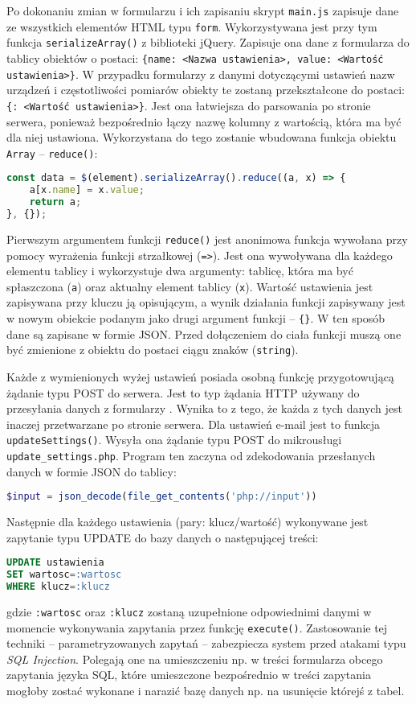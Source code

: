 \documentclass[a4paper,11pt,twoside]{article}
\begin{document}
Po dokonaniu zmian w formularzu i ich zapisaniu skrypt \texttt{main.js} zapisuje dane ze wszystkich elementów HTML typu \texttt{form}. Wykorzystywana jest przy tym funkcja \linebreak \texttt{serializeArray()} z biblioteki jQuery. Zapisuje ona dane z formularza do tablicy obiektów o postaci: \texttt{\{name: <Nazwa ustawienia>, value: <Wartość ustawienia>\}}. W przypadku formularzy z danymi dotyczącymi ustawień nazw urządzeń i częstotliwości pomiarów obiekty te zostaną przekształcone do postaci: \texttt{\{<Nazwa ustawienia>: <Wartość ustawienia>\}}. Jest ona łatwiejsza do parsowania po stronie serwera, ponieważ bezpośrednio łączy nazwę kolumny z wartością, która ma być dla niej ustawiona. Wykorzystana do tego zostanie wbudowana funkcja obiektu \texttt{Array} -- \texttt{reduce()}:
\begin{lstlisting}[language=JavaScript]
const data = $(element).serializeArray().reduce((a, x) => {
	a[x.name] = x.value;
	return a;
}, {});
\end{lstlisting}
Pierwszym argumentem funkcji \texttt{reduce()} jest anonimowa funkcja wywołana przy pomocy wyrażenia funkcji strzałkowej (\texttt{=>}). Jest ona wywoływana dla każdego elementu tablicy i wykorzystuje dwa argumenty: tablicę, która ma być spłaszczona (\texttt{a}) oraz aktualny element tablicy (\texttt{x}). Wartość ustawienia jest zapisywana przy kluczu ją opisującym, a wynik działania funkcji zapisywany jest w nowym obiekcie podanym jako drugi argument funkcji -- \texttt{\{\}}. W ten sposób dane są zapisane w formie JSON. Przed dołączeniem do ciała funkcji muszą one być zmienione z obiektu do postaci ciągu znaków (\texttt{string}).

Każde z wymienionych wyżej ustawień posiada osobną funkcję przygotowującą żądanie typu POST do serwera. Jest to typ żądania HTTP używany do przesyłania danych z formularzy \cite{http}. Wynika to z tego, że każda z tych danych jest inaczej przetwarzane po stronie serwera. Dla ustawień e-mail jest to funkcja \texttt{updateSettings()}. Wysyła ona żądanie typu POST do mikrousługi \texttt{update{\_}settings.php}. Program ten zaczyna od zdekodowania przesłanych danych w formie JSON do tablicy:
\begin{lstlisting}[language=PHP]
$input = json_decode(file_get_contents('php://input'))
\end{lstlisting}
Następnie dla każdego ustawienia (pary: klucz/wartość) wykonywane jest zapytanie typu UPDATE do bazy danych o następującej treści:
\begin{lstlisting}[language=SQL]
UPDATE ustawienia 
SET wartosc=:wartosc
WHERE klucz=:klucz
\end{lstlisting}
gdzie \texttt{:wartosc} oraz \texttt{:klucz} zostaną uzupełnione odpowiednimi danymi w momencie wykonywania zapytania przez funkcję \texttt{execute()}. Zastosowanie tej techniki -- parametryzowanych zapytań -- zabezpiecza system przed atakami typu \textit{SQL Injection}. Polegają one na umieszczeniu np. w treści formularza obcego zapytania języka SQL, które umieszczone bezpośrednio w treści zapytania mogłoby zostać wykonane i narazić bazę danych np. na usunięcie którejś z tabel.\cite{sql-injection}
\end{document}
